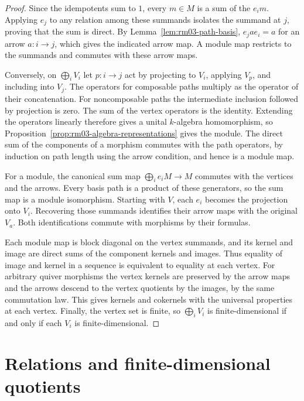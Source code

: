 \begin{proof}
Since the idempotents sum to \(1\), every \(m\in M\) is a sum of
the \(e_i m\). Applying \(e_j\) to any relation among these
summands isolates the summand at \(j\), proving that the sum is
direct. By Lemma~\ref{lem:rm03-path-basis}, \(e_j a e_i=a\) for
an arrow \(a\colon i\to j\), which gives the indicated arrow map.
A module map restricts to the summands and commutes with these
arrow maps.

Conversely, on \(\bigoplus_i V_i\) let \(p\colon i\to j\) act by
projecting to \(V_i\), applying \(V_p\), and including into
\(V_j\). The operators for composable paths multiply as the
operator of their concatenation. For noncomposable paths the
intermediate inclusion followed by projection is zero. The sum of
the vertex operators is the identity. Extending the operators
linearly therefore gives a unital \(k\)-algebra homomorphism, so
Proposition~\ref{prop:rm03-algebra-representations} gives the
module. The direct sum of the components of a morphism commutes
with the path operators, by induction on path length using the
arrow condition, and hence is a module map.

For a module, the canonical sum map \(\bigoplus_i e_iM\to M\)
commutes with the vertices and the arrows. Every basis path is a
product of these generators, so the sum map is a module
isomorphism. Starting with \(V\), each \(e_i\) becomes the
projection onto \(V_i\). Recovering those summands identifies
their arrow maps with the original \(V_a\). Both identifications
commute with morphisms by their formulas.

Each module map is block diagonal on the vertex summands, and its
kernel and image are direct sums of the component kernels and
images. Thus equality of image and kernel in a sequence is
equivalent to equality at each vertex. For arbitrary quiver
morphisms the vertex kernels are preserved by the arrow maps and
the arrows descend to the vertex quotients by the images, by the
same commutation law. This gives kernels and cokernels with the
universal properties at each vertex. Finally, the vertex set is
finite, so \(\bigoplus_i V_i\) is finite-dimensional if and only if
each \(V_i\) is finite-dimensional.
\end{proof}

\section{Relations and finite-dimensional quotients}

